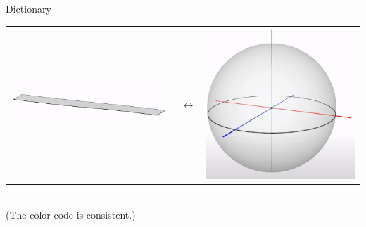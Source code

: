 \documentclass[10pt]{beamer}
\begin{document}
\begin{frame}{Dictionary}
\begin{center}
\begin{tabular}{m{4cm} m{2cm} m{3cm}}
        \includegraphics[scale=0.15]{Pictures/flatbelt.png} & $\longleftrightarrow$ & \includegraphics[scale=0.1]{Pictures/4pisphere4.png}
    \end{tabular}\\
    (The color code is consistent.)
    \end{center}
\end{frame}
\end{document}
